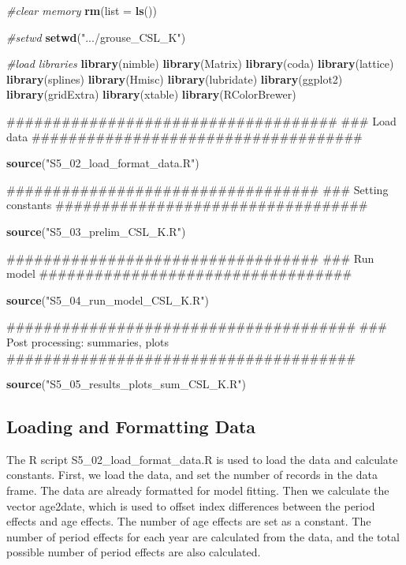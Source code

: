 \documentclass[11pt,]{article}
\newenvironment{Shaded}{\begin{snugshade}}{\end{snugshade}}
\newcommand{\KeywordTok}[1]{\textcolor[rgb]{0.13,0.29,0.53}{\textbf{#1}}}
\newcommand{\DataTypeTok}[1]{\textcolor[rgb]{0.13,0.29,0.53}{#1}}
\newcommand{\StringTok}[1]{\textcolor[rgb]{0.31,0.60,0.02}{#1}}
\newcommand{\CommentTok}[1]{\textcolor[rgb]{0.56,0.35,0.01}{\textit{#1}}}
\newcommand{\NormalTok}[1]{#1}
\begin{document}
\begin{Shaded}
\begin{Highlighting}[]
\CommentTok{#clear memory}
\KeywordTok{rm}\NormalTok{(}\DataTypeTok{list =} \KeywordTok{ls}\NormalTok{())}

\CommentTok{#setwd}
\KeywordTok{setwd}\NormalTok{(}\StringTok{".../grouse_CSL_K"}\NormalTok{)}

\CommentTok{#load libraries}
\KeywordTok{library}\NormalTok{(nimble)}
\KeywordTok{library}\NormalTok{(Matrix)}
\KeywordTok{library}\NormalTok{(coda)}
\KeywordTok{library}\NormalTok{(lattice)}
\KeywordTok{library}\NormalTok{(splines)}
\KeywordTok{library}\NormalTok{(Hmisc)}
\KeywordTok{library}\NormalTok{(lubridate)}
\KeywordTok{library}\NormalTok{(ggplot2)}
\KeywordTok{library}\NormalTok{(gridExtra)}
\KeywordTok{library}\NormalTok{(xtable)}
\KeywordTok{library}\NormalTok{(RColorBrewer)}

\NormalTok{####################################}
\NormalTok{### Load data}
\NormalTok{####################################}

\KeywordTok{source}\NormalTok{(}\StringTok{"S5_02_load_format_data.R"}\NormalTok{)}

\NormalTok{##################################}
\NormalTok{### Setting constants}
\NormalTok{##################################}

\KeywordTok{source}\NormalTok{(}\StringTok{"S5_03_prelim_CSL_K.R"}\NormalTok{)}

\NormalTok{##################################}
\NormalTok{### Run model}
\NormalTok{##################################}

\KeywordTok{source}\NormalTok{(}\StringTok{"S5_04_run_model_CSL_K.R"}\NormalTok{)}

\NormalTok{######################################}
\NormalTok{### Post processing: summaries, plots}
\NormalTok{######################################}

\KeywordTok{source}\NormalTok{(}\StringTok{"S5_05_results_plots_sum_CSL_K.R"}\NormalTok{)}
\end{Highlighting}
\end{Shaded}

\subsection{Loading and Formatting
Data}\label{loading-and-formatting-data}

The R script S5\_02\_load\_format\_data.R is used to load the data and
calculate constants. First, we load the data, and set the number of
records in the data frame. The data are already formatted for model
fitting. Then we calculate the vector age2date, which is used to offset
index differences between the period effects and age effects. The number
of age effects are set as a constant. The number of period effects for
each year are calculated from the data, and the total possible number of
period effects are also calculated.
\end{document}
